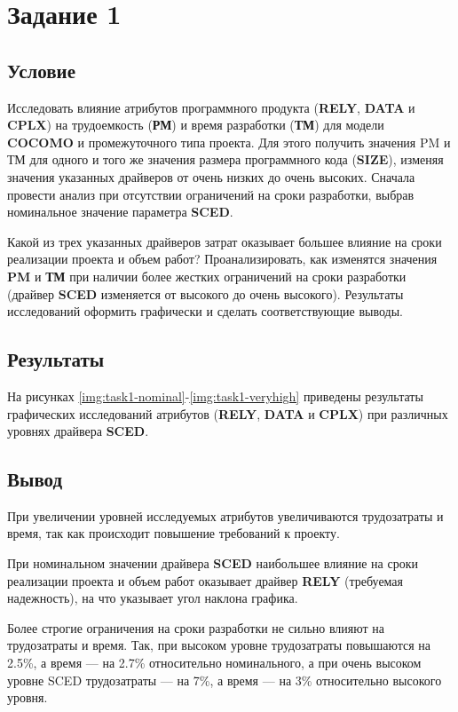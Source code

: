 \section{Задание 1}

\subsection{Условие}

Исследовать влияние атрибутов программного продукта (\textbf{RELY}, \textbf{DATA} и \textbf{CPLX}) на трудоемкость (\textbf{РМ}) и время разработки (\textbf{ТМ}) для модели \textbf{COCOMO} и промежуточного типа проекта. Для этого получить значения PM и ТМ для одного и того же значения размера программного кода (\textbf{SIZE}), изменяя значения указанных драйверов от очень низких до очень высоких. Сначала провести анализ при отсутствии ограничений на сроки разработки, выбрав номинальное значение параметра \textbf{SCED}. 

Какой из трех указанных драйверов затрат оказывает большее влияние на сроки реализации проекта и объем работ? Проанализировать, как изменятся значения \textbf{PM} и \textbf{ТМ} при наличии более жестких ограничений на сроки разработки (драйвер \textbf{SCED} изменяется от высокого до очень высокого). Результаты исследований оформить графически и сделать соответствующие выводы.

\subsection{Результаты}

На рисунках \ref{img:task1-nominal}-\ref{img:task1-veryhigh} приведены результаты графических исследований атрибутов (\textbf{RELY}, \textbf{DATA} и \textbf{CPLX}) при различных уровнях драйвера \textbf{SCED}.




\subsection{Вывод}

При увеличении уровней исследуемых атрибутов увеличиваются трудозатраты и время, так как происходит повышение требований к проекту.

При номинальном значении драйвера \textbf{SCED} наибольшее влияние на сроки реализации проекта и объем работ оказывает драйвер \textbf{RELY} (требуемая надежность), на что указывает угол наклона графика.

Более строгие ограничения на сроки разработки не сильно влияют на трудозатраты и время. Так, при высоком уровне трудозатраты повышаются на 2.5\%, а время --- на 2.7\% относительно номинального, а при очень высоком уровне SCED трудозатраты --- на 7\%, а время --- на 3\% относительно высокого уровня.
